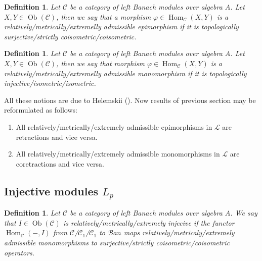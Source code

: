 \documentclass[12pt]{article}
\newtheorem{definition}[theorem]{Definition}
\begin{document}
\begin{definition}\label{AdmEpiMorph} Let $\mathscr{C}$ be a category of left
    Banach modules over algebra $A$. Let $X,Y\in\operatorname{Ob}(\mathscr{C})$,
    then we say that a morphism
    $\varphi\in\operatorname{Hom}_{\mathscr{C}}(X,Y)$ is a
    relatively/metrically/extremelly admissible epimorphism if it is
    topologically surjective/strictly coisometric/coisometric.
\end{definition}

\begin{definition}\label{AdmMonoMorph} Let $\mathscr{C}$ be a category of
    left Banach modules over algebra $A$. Let
    $X,Y\in\operatorname{Ob}(\mathscr{C})$, then we say that
    morphism $\varphi\in\operatorname{Hom}_{\mathscr{C}}(X,Y)$ is a
    relatively/metrically/extremelly admissible monomorphism if it is
    topologically injective/isometric/isometric.
\end{definition}


All these notions are due to Helemskii (\cite{HelMetFrPoj}). Now results of
previous section may be reformulated as follows:
\begin{enumerate}[label = (\roman*)]
    \item  All relatively/metrically/extremely admissible epimorphisms in
          $\mathscr{L}$ are retractions and vice versa.

    \item All relatively/metrically/extremely admissible monomorphisms in
          $\mathscr{L}$ are coretractions and vice versa.
\end{enumerate}



\subsection{Injective modules \texorpdfstring{$L_p$}{Lp}}

\begin{definition} Let $\mathscr{C}$ be a category of left Banach modules over
    algebra $A$. We say that $I\in\operatorname{Ob}(\mathscr{C})$ is
    relatively/metrically/extremely injecive if the functor
    $\operatorname{Hom}_{\mathscr{C}}(-,I)$ from
    $\mathscr{C}$/$\mathscr{C}_1$/$\mathscr{C}_1$ to $\mathscr{B}an$ maps
    relatively/metricaly/extremely admissible monomorphisms to
    surjective/strictly coisometric/coisometric operators.
\end{definition}
\end{document}
